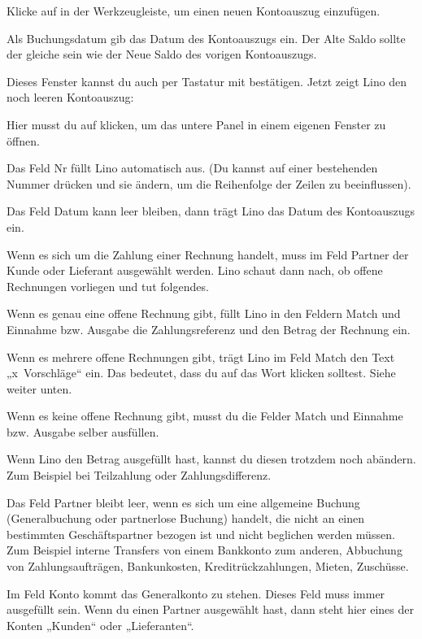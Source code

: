 \documentclass[letterpaper,10pt,ngerman]{sphinxmanual}
\begin{document}
Klicke auf  in der Werkzeugleiste, um einen neuen Kontoauszug
einzufügen.

Als Buchungsdatum gib das Datum des Kontoauszugs ein. Der Alte Saldo
sollte der gleiche sein wie der Neue Saldo des vorigen Kontoauszugs.

Dieses Fenster kannst du auch per Tastatur mit 
bestätigen.  Jetzt zeigt Lino den noch leeren Kontoauszug:

Hier musst du auf  klicken, um das untere Panel in einem
eigenen Fenster zu öffnen.

Das Feld Nr füllt Lino automatisch aus. (Du kannst auf einer
bestehenden Nummer  drücken und sie ändern, um die
Reihenfolge der Zeilen zu beeinflussen).

Das Feld Datum kann leer bleiben, dann trägt Lino das Datum des
Kontoauszugs ein.

Wenn es sich um die Zahlung einer Rechnung handelt, muss im Feld
Partner der Kunde oder Lieferant ausgewählt werden. Lino schaut dann
nach, ob offene Rechnungen vorliegen und tut folgendes.

Wenn es genau eine offene Rechnung gibt, füllt Lino in den Feldern
Match und Einnahme bzw. Ausgabe die Zahlungsreferenz und den Betrag
der Rechnung ein.

Wenn es mehrere offene Rechnungen gibt, trägt Lino im Feld Match den
Text „x Vorschläge“ ein. Das bedeutet, dass du auf das Wort
 klicken solltest.  Siehe weiter unten.

Wenn es keine offene Rechnung gibt, musst du die Felder Match und
Einnahme bzw. Ausgabe selber ausfüllen.

Wenn Lino den Betrag ausgefüllt hast, kannst du diesen trotzdem noch
abändern. Zum Beispiel bei Teilzahlung oder Zahlungsdifferenz.

Das Feld Partner bleibt leer, wenn es sich um eine allgemeine Buchung
(Generalbuchung oder partnerlose Buchung) handelt, die nicht an einen
bestimmten Geschäftspartner bezogen ist und nicht beglichen werden
müssen. Zum Beispiel interne Transfers von einem Bankkonto zum
anderen, Abbuchung von Zahlungsaufträgen, Bankunkosten,
Kreditrückzahlungen, Mieten, Zuschüsse.

Im Feld Konto kommt das Generalkonto zu stehen. Dieses Feld muss immer
ausgefüllt sein. Wenn du einen Partner ausgewählt hast, dann steht
hier eines der Konten „Kunden“ oder „Lieferanten“.
\end{document}
